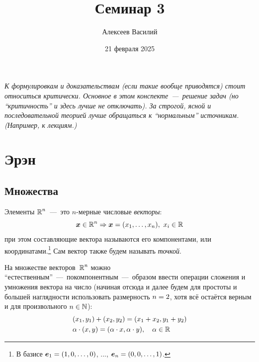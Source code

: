 \documentclass[a4paper,12pt]{article}
\author{Алексеев Василий}
\title{Семинар 3}
\date{21 февраля 2025}
\begin{document}
  \maketitle
  
  \tableofcontents

  \thispagestyle{empty}
  
  \newpage
  
  
  
  \vspace*{\fill}
  
  \noindent
  \emph{
    К формулировкам и доказательствам (если такие вообще приводятся) стоит относиться критически.
    Основное в этом конспекте~---~решение задач (но ``критичность'' и здесь лучше не отключать).
    За строгой, ясной и последовательной теорией лучше обращаться к ``нормальным'' источникам.
    (Например, к лекциям.)
  }
  
  \vspace*{\fill}
  
  \thispagestyle{empty}
  
  \newpage
  
  

  \section{Эрэн}


  \subsection{Множества}

  Элементы $\operatorname{\mathbb R}^n$~---~это $n$-мерные числовые \emph{векторы}:
  \[
    \boldsymbol x \in \operatorname{\mathbb R}^n \Rightarrow \boldsymbol x = (x_1, \ldots, x_n),\ x_i \in \operatorname{\mathbb R}
  \]
  при этом составляющие вектора называются его компонентами, или координатами.\footnote{
    В базисе $\bds e_1 \hm= (1, 0, \ldots, 0)$, ..., $\bds e_n \hm= (0, 0, \ldots, 1)$.
  }
  Сам вектор также будем называть \emph{точкой}.

  На множестве векторов~$\operatorname{\mathbb R}^n$ можно ``естественным''~---~покомпонентным~---~образом ввести операции сложения и умножения вектора на число (начиная отсюда и далее будем для простоты и большей наглядности использовать размерность $n \hm= 2$, хотя всё остаётся верным и для произвольного $n \in \mathbb N$):
  \[
    \begin{aligned}
      &(x_1, y_1) + (x_2, y_2) = (x_1 + x_2, y_1 + y_2)\\
      &\alpha \cdot (x, y) = (\alpha \cdot x, \alpha \cdot y),\quad \alpha \in \operatorname{\mathbb R}
    \end{aligned}
  \]
\end{document}
